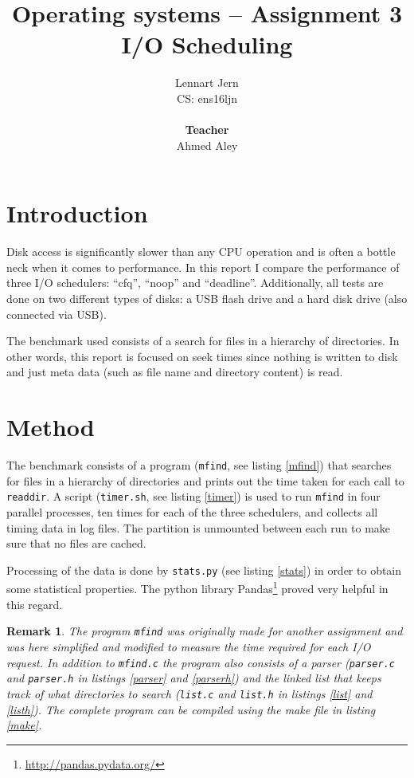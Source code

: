 \documentclass[12pt, a4paper]{article} %
\title{Operating systems -- Assignment 3\\I/O Scheduling}
\author{Lennart Jern\\
	CS: ens16ljn\\ \\ \textbf{Teacher}\\ Ahmed Aley}
\newtheorem{remark}{Remark}
\begin{document}
\maketitle

\newpage


\section{Introduction}

Disk access is significantly slower than any CPU operation and is often a bottle neck when it comes to performance.
In this report I compare the performance of three I/O schedulers: ``cfq'', ``noop'' and ``deadline''.
Additionally, all tests are done on two different types of disks: a USB flash drive and a hard disk drive (also connected via USB).

The benchmark used consists of a search for files in a hierarchy of directories.
In other words, this report is focused on seek times since nothing is written to disk and just meta data (such as file name and directory content) is read.

\section{Method}

The benchmark consists of a program (\texttt{mfind}, see listing \ref{mfind}) that searches for files in a hierarchy of directories and prints out the time taken for each call to \texttt{readdir}.
A script (\texttt{timer.sh}, see listing \ref{timer}) is used to run \texttt{mfind} in four parallel processes, ten times for each of the three schedulers, and collects all timing data in log files.
The partition is unmounted between each run to make sure that no files are cached.

Processing of the data is done by \texttt{stats.py} (see listing \ref{stats}) in order to obtain some statistical properties.
The python library Pandas\footnote{\url{http://pandas.pydata.org/}} proved very helpful in this regard.

\begin{remark}
	The program \texttt{mfind} was originally made for another assignment and was here simplified and modified to measure the time required for each I/O request.
	In addition to \texttt{mfind.c} the program also consists of a parser (\texttt{parser.c} and \texttt{parser.h} in listings \ref{parser} and \ref{parserh}) and the linked list that keeps track of what directories to search (\texttt{list.c} and \texttt{list.h} in listings \ref{list} and \ref{listh}).
	The complete program can be compiled using the make file in listing \ref{make}.
\end{remark}
\end{document}
